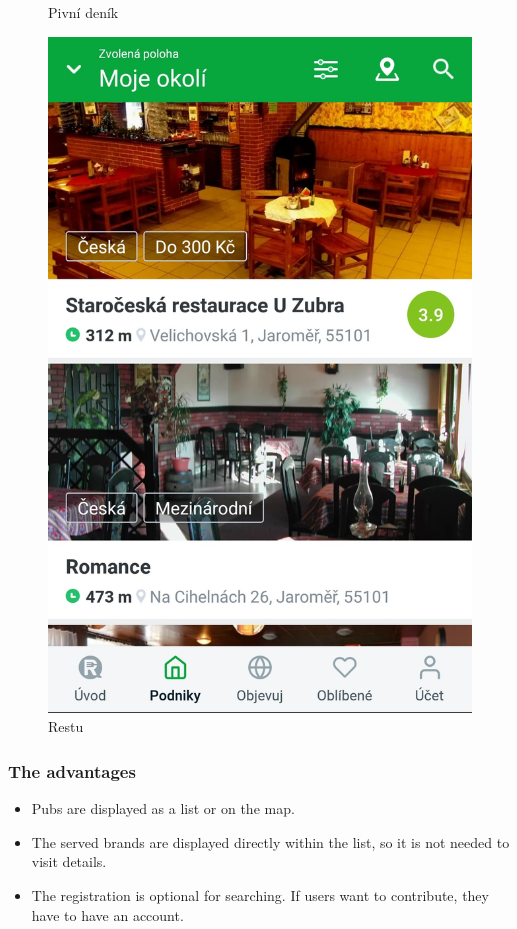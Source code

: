\begin{figure}[ht]
\begin{minipage}{0.45\linewidth}
        \caption{Pivní deník \cite{app-pivni-denik}}
        \label{fig:pivni-denik}
    \end{minipage}\hfill
    \begin{minipage}{0.45\linewidth}
        \centering
        \includegraphics[width=0.75\linewidth]{img/analysis/restu.jpg}
        \caption{Restu \cite{app-restu}}
        \label{fig:restu}
    \end{minipage}
\end{figure}


\subsubsection{The advantages}
\begin{itemize}
    \item Pubs are displayed as a list or on the map.
    \item The served brands are displayed directly within the list, so it is not needed to visit details.
    \item The registration is optional for searching. If users want to contribute, they have to have an account.
\end{itemize}

